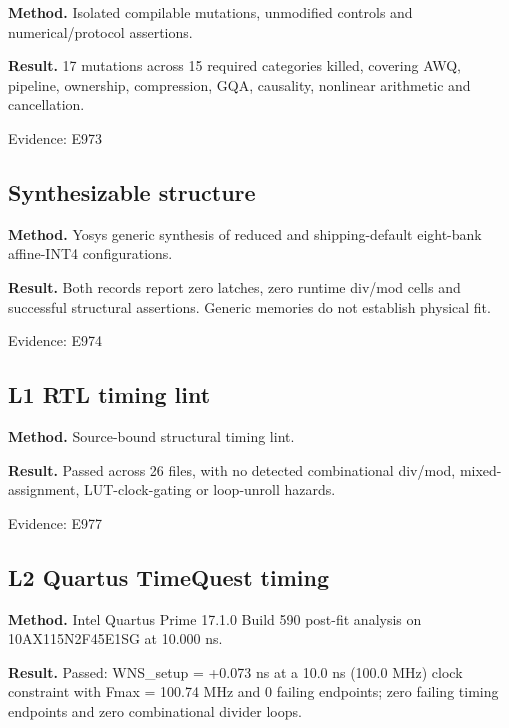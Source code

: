 \documentclass[11pt,a4paper]{article}
\begin{document}
\textbf{Method.} Isolated compilable mutations,\allowbreak{} unmodified controls and numerical/\allowbreak{}protocol assertions.

\textbf{Result.} 17 mutations across 15 required categories killed,\allowbreak{} covering AWQ,\allowbreak{} pipeline,\allowbreak{} ownership,\allowbreak{} compression,\allowbreak{} GQA,\allowbreak{} causality,\allowbreak{} nonlinear arithmetic and cancellation.

{\small Evidence: E973}

\subsection{Synthesizable structure}

\textbf{Method.} Yosys generic synthesis of reduced and shipping-default eight-bank affine-INT4 configurations.

\textbf{Result.} Both records report zero latches,\allowbreak{} zero runtime div/\allowbreak{}mod cells and successful structural assertions. Generic memories do not establish physical fit.

{\small Evidence: E974}

\subsection{L1 RTL timing lint}

\textbf{Method.} Source-bound structural timing lint.

\textbf{Result.} Passed across 26 files,\allowbreak{} with no detected combinational div/\allowbreak{}mod,\allowbreak{} mixed-assignment,\allowbreak{} LUT-clock-gating or loop-unroll hazards.

{\small Evidence: E977}

\subsection{L2 Quartus TimeQuest timing}

\textbf{Method.} Intel Quartus Prime 17.1.0 Build 590 post-fit analysis on 10AX115N2F45E1SG at 10.000 ns.

\textbf{Result.} Passed: WNS\_\allowbreak{}setup =\allowbreak{} +\allowbreak{}0.073 ns at a 10.0 ns (\allowbreak{}100.0 MHz)\allowbreak{} clock constraint with Fmax =\allowbreak{} 100.74 MHz and 0 failing endpoints; zero failing timing endpoints and zero combinational divider loops.
\end{document}
